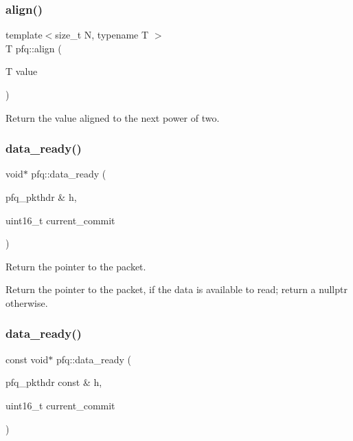 \subsubsection{\texorpdfstring{align()}{align()}}
{\footnotesize\ttfamily template$<$size\+\_\+t N, typename T $>$ \\
T pfq\+::align (\begin{DoxyParamCaption}\item[{T}]{value }\end{DoxyParamCaption})\hspace{0.3cm}{\ttfamily [inline]}}



Return the value aligned to the next power of two. 

\mbox{\label{namespacepfq_aa380c5b13ef3af69ccd6e1090b388891}} 
\subsubsection{\texorpdfstring{data\+\_\+ready()}{data\_ready()}\hspace{0.1cm}{\footnotesize\ttfamily [1/2]}}
{\footnotesize\ttfamily void$\ast$ pfq\+::data\+\_\+ready (\begin{DoxyParamCaption}\item[{pfq\+\_\+pkthdr \&}]{h,  }\item[{uint16\+\_\+t}]{current\+\_\+commit }\end{DoxyParamCaption})\hspace{0.3cm}{\ttfamily [inline]}}



Return the pointer to the packet. 

Return the pointer to the packet, if the data is available to read; return a nullptr otherwise. \mbox{\label{namespacepfq_a992de53ff3615a0e00640bde94726b24}} 
\subsubsection{\texorpdfstring{data\+\_\+ready()}{data\_ready()}\hspace{0.1cm}{\footnotesize\ttfamily [2/2]}}
{\footnotesize\ttfamily const void$\ast$ pfq\+::data\+\_\+ready (\begin{DoxyParamCaption}\item[{pfq\+\_\+pkthdr const \&}]{h,  }\item[{uint16\+\_\+t}]{current\+\_\+commit }\end{DoxyParamCaption})\hspace{0.3cm}{\ttfamily [inline]}}



